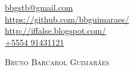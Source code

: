 \documentclass[a4paper, 10pt]{article}
\begin{document}
    \pagestyle{empty}
	\begin{flushright}
        \href{mailto:bbgstb@gmail.com}{bbgstb@gmail.com} \\
        \href{https://github.com/bbguimaraes/}{https://github.com/bbguimaraes/} \\
        \href{http://iffalse.blogspot.com/}{http://iffalse.blogspot.com/} \\
        \href{tel:+5554 91431121}{+5554 91431121} \\
    \end{flushright}
    \vspace{5mm}
    \textsc{\Huge Bruno Barcarol Guimarães} \\\\\\\\\\\\
\end{document}
